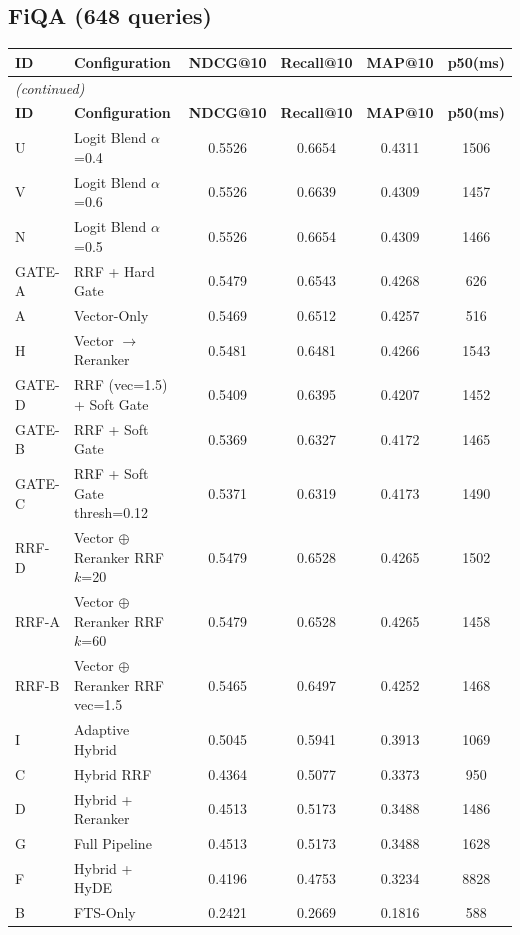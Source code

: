 \documentclass[11pt]{article}
\begin{document}
\subsection{FiQA (648 queries)}

\begin{longtable}{llcccc}
\toprule
\textbf{ID} & \textbf{Configuration} & \textbf{NDCG@10} & \textbf{Recall@10} & \textbf{MAP@10} & \textbf{p50(ms)} \\
\midrule
\endfirsthead
\multicolumn{6}{l}{\emph{(continued)}} \\
\toprule
\textbf{ID} & \textbf{Configuration} & \textbf{NDCG@10} & \textbf{Recall@10} & \textbf{MAP@10} & \textbf{p50(ms)} \\
\midrule
\endhead
\bottomrule
\endlastfoot
U & Logit Blend $\alpha$=0.4 & 0.5526 & 0.6654 & 0.4311 & 1506 \\
V & Logit Blend $\alpha$=0.6 & 0.5526 & 0.6639 & 0.4309 & 1457 \\
N & Logit Blend $\alpha$=0.5 & 0.5526 & 0.6654 & 0.4309 & 1466 \\
GATE-A & RRF + Hard Gate & 0.5479 & 0.6543 & 0.4268 & 626 \\
A & Vector-Only & 0.5469 & 0.6512 & 0.4257 & 516 \\
H & Vector $\to$ Reranker & 0.5481 & 0.6481 & 0.4266 & 1543 \\
GATE-D & RRF (vec=1.5) + Soft Gate & 0.5409 & 0.6395 & 0.4207 & 1452 \\
GATE-B & RRF + Soft Gate & 0.5369 & 0.6327 & 0.4172 & 1465 \\
GATE-C & RRF + Soft Gate thresh=0.12 & 0.5371 & 0.6319 & 0.4173 & 1490 \\
RRF-D & Vector $\oplus$ Reranker RRF $k$=20 & 0.5479 & 0.6528 & 0.4265 & 1502 \\
RRF-A & Vector $\oplus$ Reranker RRF $k$=60 & 0.5479 & 0.6528 & 0.4265 & 1458 \\
RRF-B & Vector $\oplus$ Reranker RRF vec=1.5 & 0.5465 & 0.6497 & 0.4252 & 1468 \\
I & Adaptive Hybrid & 0.5045 & 0.5941 & 0.3913 & 1069 \\
C & Hybrid RRF & 0.4364 & 0.5077 & 0.3373 & 950 \\
D & Hybrid + Reranker & 0.4513 & 0.5173 & 0.3488 & 1486 \\
G & Full Pipeline & 0.4513 & 0.5173 & 0.3488 & 1628 \\
F & Hybrid + HyDE & 0.4196 & 0.4753 & 0.3234 & 8828 \\
B & FTS-Only & 0.2421 & 0.2669 & 0.1816 & 588 \\
\end{longtable}
\end{document}
